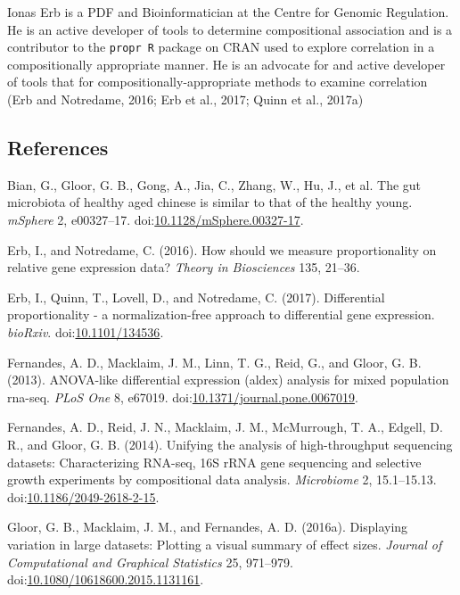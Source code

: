 \documentclass[twocolumn]{article}
\begin{document}
Ionas Erb is a PDF and Bioinformatician at the Centre for Genomic
Regulation. He is an active developer of tools to determine
compositional association and is a contributor to the \texttt{propr\ R}
package on CRAN used to explore correlation in a compositionally
appropriate manner. He is an advocate for and active developer of tools
that for compositionally-appropriate methods to examine correlation (Erb
and Notredame, 2016; Erb et al., 2017; Quinn et al., 2017a)

\hypertarget{references}{%
\subsection*{References}\label{references}}

\hypertarget{refs}{}
\leavevmode\hypertarget{ref-bian:2017}{}%
Bian, G., Gloor, G. B., Gong, A., Jia, C., Zhang, W., Hu, J., et al. The
gut microbiota of healthy aged chinese is similar to that of the healthy
young. \emph{mSphere} 2, e00327--17.
doi:\href{https://doi.org/10.1128/mSphere.00327-17}{10.1128/mSphere.00327-17}.

\leavevmode\hypertarget{ref-erb:2016}{}%
Erb, I., and Notredame, C. (2016). How should we measure proportionality
on relative gene expression data? \emph{Theory in Biosciences} 135,
21--36.

\leavevmode\hypertarget{ref-Erb134536}{}%
Erb, I., Quinn, T., Lovell, D., and Notredame, C. (2017). Differential
proportionality - a normalization-free approach to differential gene
expression. \emph{bioRxiv}.
doi:\href{https://doi.org/10.1101/134536}{10.1101/134536}.

\leavevmode\hypertarget{ref-fernandes:2013}{}%
Fernandes, A. D., Macklaim, J. M., Linn, T. G., Reid, G., and Gloor, G.
B. (2013). ANOVA-like differential expression (aldex) analysis for mixed
population rna-seq. \emph{PLoS One} 8, e67019.
doi:\href{https://doi.org/10.1371/journal.pone.0067019}{10.1371/journal.pone.0067019}.

\leavevmode\hypertarget{ref-fernandes:2014}{}%
Fernandes, A. D., Reid, J. N., Macklaim, J. M., McMurrough, T. A.,
Edgell, D. R., and Gloor, G. B. (2014). Unifying the analysis of
high-throughput sequencing datasets: Characterizing RNA-seq, 16S rRNA
gene sequencing and selective growth experiments by compositional data
analysis. \emph{Microbiome} 2, 15.1--15.13.
doi:\href{https://doi.org/10.1186/2049-2618-2-15}{10.1186/2049-2618-2-15}.

\leavevmode\hypertarget{ref-gloor:effect}{}%
Gloor, G. B., Macklaim, J. M., and Fernandes, A. D. (2016a). Displaying
variation in large datasets: Plotting a visual summary of effect sizes.
\emph{Journal of Computational and Graphical Statistics} 25, 971--979.
doi:\href{https://doi.org/10.1080/10618600.2015.1131161}{10.1080/10618600.2015.1131161}.
\end{document}
